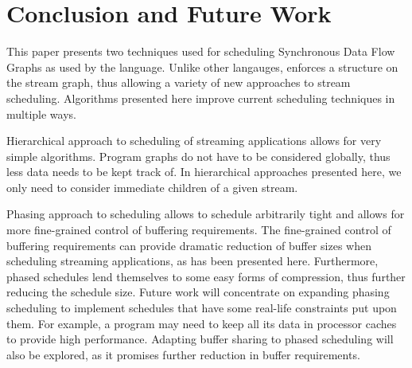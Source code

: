 \section{Conclusion and Future Work}

This paper presents two techniques used for scheduling Synchronous
Data Flow Graphs as used by the {\StreamIt} language. Unlike other
langauges, {\StreamIt} enforces a structure on the stream graph,
thus allowing a variety of new approaches to stream scheduling.
Algorithms presented here improve current scheduling techniques in
multiple ways.

Hierarchical approach to scheduling of streaming applications
allows for very simple algorithms. Program graphs do not have to
be considered globally, thus less data needs to be kept track of.
In hierarchical approaches presented here, we only need to
consider immediate children of a given stream.

Phasing approach to scheduling allows to schedule arbitrarily
tight {{\feedbackloops}} and allows for more fine-grained control
of buffering requirements. The fine-grained control of buffering
requirements can provide dramatic reduction of buffer sizes when
scheduling streaming applications, as has been presented here.
Furthermore, phased schedules lend themselves to some easy forms
of compression, thus further reducing the schedule size. Future
work will concentrate on expanding phasing scheduling to implement
schedules that have some real-life constraints put upon them. For
example, a program may need to keep all its data in processor
caches to provide high performance. Adapting buffer sharing to
phased scheduling will also be explored, as it promises further
reduction in buffer requirements.
